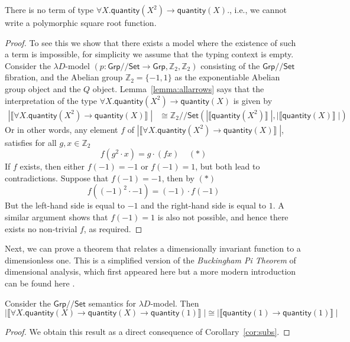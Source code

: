 \documentclass[a4paper,UKenglish]{lipics}
\newcommand{\msf}[1]{\mathsf{#1}} %
\newcommand{\Grp}{\msf{Grp}}
\newcommand{\Set}{\msf{Set}}
\newcommand{\GroupSet}[1]{#1/\!/\Set}
\newcommand{\GrpSet}{\GroupSet{\Grp}}
\newcommand{\bbZ}{\mathbb{Z}}
\newcommand{\sem}[1]{\ensuremath{\llbracket #1 \rrbracket} \;}
\newcommand{\qnt}{\msf{quantity}}
\begin{document}
\begin{theorem}
\label{thm:UninhabType}
 There is no term of type $\forall X . \qnt(X^2) \rightarrow \qnt(X)$., i.e., we cannot write a polymorphic square root function.
\end{theorem}
\begin{proof}
To see this we show that there exists a model where the existence of such a term is impossible, for simplicity we assume that the typing context is empty. Consider the $\lambda D$-model $(p:\GrpSet \rightarrow \Grp, \mathbb{Z}_2, \mathbb{Z}_2)$  consisting of the $\GrpSet$ fibration, and the Abelian group $\mathbb{Z}_2 = \{ -1, 1\}$ as the exponentiable Abelian group object and the $Q$ object. Lemma~\ref{lemma:allarrows} says that the interpretation of the type $\forall X . \qnt(X^2) \rightarrow \qnt(X)$ is given by
\begin{align*}
  |\sem{\forall X . \qnt(X^2) \rightarrow \qnt(X)}|  &  \cong \GroupSet{\mathbb{Z}_2} (|\sem{\qnt (X^2)}|, |\sem{\qnt(X)}|)
\end{align*}
Or in other words, any element $f$ of $ |\sem{\forall X . \qnt(X^2) \rightarrow \qnt(X)}|$, satisfies for all $g, x \in \bbZ_2$
\[
f (g^2 \cdot x) = g \cdot (fx) \; \; \; \; (\ast)
\]
If $f$ exists, then either $f(-1) = -1$ or $f(-1) = 1$, but both lead to contradictions. Suppose that $f(-1) = -1$, then by $(\ast)$
\[
 f((-1)^2 \cdot -1) = (-1) \cdot f(-1)
\]
But the left-hand side is equal to $-1$ and the right-hand side is equal to $1$. A similar argument shows that $f(-1)=1$ is also not possible, and hence there exists no non-trivial $f$, as required.
\end{proof}

Next, we can prove a theorem that relates a dimensionally invariant function to a dimensionless one. This is a simplified version of the \emph{Buckingham Pi Theorem} of dimensional analysis, which first appeared here \cite{buckingham1914physically} but a more modern introduction can be found here \cite{sonin2001physical}.

\begin{theorem}
 \label{lem:AppSubs}
Consider the $\GrpSet$ semantics for $\lambda D$-model. Then
\[
 |\sem{\forall X . \qnt(X) \rightarrow \qnt(X) \rightarrow \qnt(1)}| \cong |\sem{\qnt(1)\rightarrow \qnt(1)}|
\]
\end{theorem}
\begin{proof}
We obtain this result as a direct consequence of Corollary~\ref{cor:subs}.
\end{proof}
\end{document}
